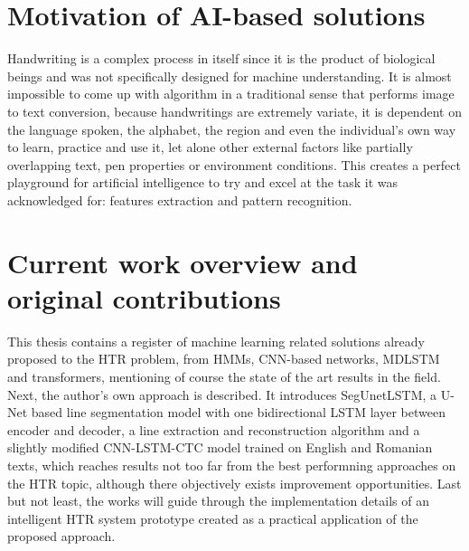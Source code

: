 \section{Motivation of AI-based solutions}

Handwriting is a complex process in itself since it is the product of biological beings and was not specifically designed for machine understanding. It is almost impossible to come up with algorithm in a traditional sense that performs image to text conversion, because handwritings are extremely variate, it is dependent on the language spoken, the alphabet, the region and even the individual's own way to learn, practice and use it, let alone other external factors like partially overlapping text, pen properties or environment conditions. This creates a perfect playground for artificial intelligence to try and excel at the task it was acknowledged for: features extraction and pattern recognition.

\section{Current work overview and original contributions}

This thesis contains a register of machine learning related solutions already proposed to the HTR problem, from HMMs, CNN-based networks, MDLSTM and transformers, mentioning of course the state of the art results in the field. Next, the author's own approach is described. It introduces SegUnetLSTM, a U-Net based line segmentation model with one bidirectional LSTM layer between encoder and decoder, a line extraction and reconstruction algorithm and a slightly modified CNN-LSTM-CTC model trained on English and Romanian texts, which reaches results not too far from the best performning approaches on the HTR topic, although there objectively exists improvement opportunities. Last but not least, the works will guide through the implementation details of an intelligent HTR system prototype created as a practical application of the proposed approach.